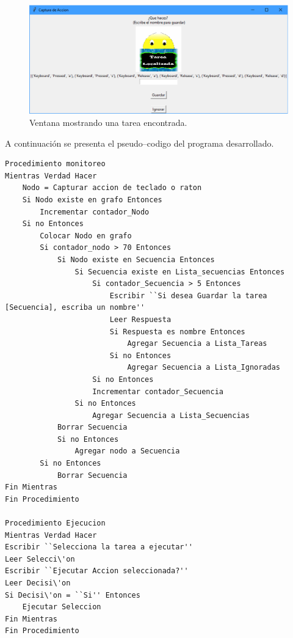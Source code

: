\begin{figure}[H]
\centering
\includegraphics[width=0.9\columnwidth]{chap4/Imagenes/ventana2.eps}
\caption{Ventana mostrando una tarea encontrada.}
\label{fig:v02}
\end{figure}

A continuaci\'on se presenta el pseudo--codigo del programa desarrollado.

\begin{table}[]
\begin{lstlisting}
Procedimiento monitoreo
Mientras Verdad Hacer
    Nodo = Capturar accion de teclado o raton
    Si Nodo existe en grafo Entonces
        Incrementar contador_Nodo
    Si no Entonces
		Colocar Nodo en grafo
		Si contador_nodo > 70 Entonces
			Si Nodo existe en Secuencia Entonces
				Si Secuencia existe en Lista_secuencias Entonces
					Si contador_Secuencia > 5 Entonces
						Escribir ``Si desea Guardar la tarea [Secuencia], escriba un nombre''
						Leer Respuesta
						Si Respuesta es nombre Entonces
							Agregar Secuencia a Lista_Tareas
						Si no Entonces 
							Agregar Secuencia a Lista_Ignoradas
					Si no Entonces
					Incrementar contador_Secuencia
				Si no Entonces
					Agregar Secuencia a Lista_Secuencias
            Borrar Secuencia
            Si no Entonces
		        Agregar nodo a Secuencia
		Si no Entonces
            Borrar Secuencia
Fin Mientras
Fin Procedimiento 

Procedimiento Ejecucion
Mientras Verdad Hacer
Escribir ``Selecciona la tarea a ejecutar''
Leer Selecci\'on
Escribir ``Ejecutar Accion seleccionada?''
Leer Decisi\'on
Si Decisi\'on = ``Si'' Entonces
	Ejecutar Seleccion
Fin Mientras
Fin Procedimiento

\end{lstlisting}
\end{table}